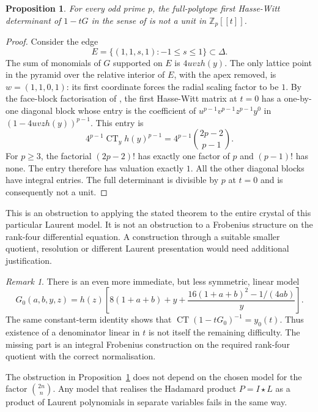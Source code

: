\documentclass[11pt]{amsart}
\newtheorem{proposition}[theorem]{Proposition}
\theoremstyle{definition}
\theoremstyle{remark}
\newtheorem{remark}[theorem]{Remark}
\begin{document}
\begin{proposition}\label{prop:linear-hw-obstruction}
For every odd prime $p$, the full-polytope first Hasse-Witt determinant
of $1-tG$ in the sense of \cite[Definition~3.2]{BV} is not a unit in
$\mathbb Z_p[[t]]$.
\end{proposition}

\begin{proof}
Consider the edge
\[
 E=\{(1,1,s,1):-1\le s\le1\}\subset\Delta.
\]
The sum of monomials of $G$ supported on $E$ is $4uvz h(y)$.
The only lattice point in the pyramid over the relative interior of
$E$, with the apex removed, is $w=(1,1,0,1)$: its first coordinate
forces the radial scaling factor to be $1$.
By the face-block factorisation of \cite[Proposition~3.5 and
Lemma~3.6]{BV}, the first Hasse-Witt matrix at $t=0$ has a
one-by-one diagonal block whose entry is the coefficient of
$u^{p-1}v^{p-1}z^{p-1}y^0$ in
$(1-4uvz h(y))^{p-1}$.  This entry is
\[
 4^{p-1}\operatorname{CT}_y h(y)^{p-1}
 =4^{p-1}\binom{2p-2}{p-1}.
\]
For $p\ge3$, the factorial $(2p-2)!$ has exactly one factor of $p$
and $(p-1)!$ has none.  The entry therefore has valuation exactly
$1$.  All the other diagonal blocks have integral entries.  The full
determinant is divisible by $p$ at $t=0$ and is consequently not a unit.
\end{proof}

This is an obstruction to applying the stated theorem to the entire
crystal of this particular Laurent model.  It is not an obstruction
to a Frobenius structure on the rank-four differential equation.
A construction through a suitable smaller quotient, resolution or
different Laurent presentation would need additional justification.

\begin{remark}
There is an even more immediate, but less symmetric, linear model
\[
 G_0(a,b,y,z)=h(z)\left[8(1+a+b)+y+
             \frac{16(1+a+b)^2-1/(4ab)}{y}\right].
\]
The same constant-term identity shows that
$\operatorname{CT}(1-tG_0)^{-1}=y_0(t)$.
Thus existence of a denominator linear in $t$ is not itself the
remaining difficulty.  The missing part is an integral Frobenius
construction on the required rank-four quotient with the correct
normalisation.
\end{remark}

The obstruction in Proposition~\ref{prop:linear-hw-obstruction} does not
depend on the chosen model for the factor $\binom{2n}{n}$.  Any model
that realises the Hadamard product $P=I\star L$ as a product of Laurent
polynomials in separate variables fails in the same way.
\end{document}
